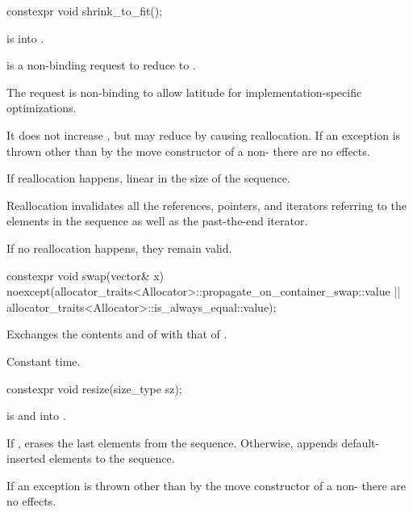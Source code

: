 %
\begin{itemdecl}
constexpr void shrink_to_fit();
\end{itemdecl}

\begin{itemdescr}
\pnum
\expects
{} is  into .

\pnum
\effects
{} is a non-binding request to reduce
 to .
\begin{note}
The request is non-binding to allow latitude for
implementation-specific optimizations.
\end{note}
It does not increase , but may reduce 
by causing reallocation.
If an exception is thrown other than by the move constructor
of a non-  there are no effects.

\pnum
\complexity
If reallocation happens,
linear in the size of the sequence.

\pnum
\remarks
Reallocation invalidates all the references, pointers, and iterators
referring to the elements in the sequence as well as the past-the-end iterator.
\begin{note}
If no reallocation happens, they remain valid.
\end{note}
\end{itemdescr}

%
\begin{itemdecl}
constexpr void swap(vector& x)
  noexcept(allocator_traits<Allocator>::propagate_on_container_swap::value ||
           allocator_traits<Allocator>::is_always_equal::value);
\end{itemdecl}

\begin{itemdescr}
\pnum
\effects
Exchanges the contents and
of
with that of .

\pnum
\complexity
Constant time.
\end{itemdescr}

%
\begin{itemdecl}
constexpr void resize(size_type sz);
\end{itemdecl}

\begin{itemdescr}
\pnum
\expects
{} is
 and  into .

\pnum
\effects
If , erases the last  elements
from the sequence. Otherwise,
appends  default-inserted elements to the sequence.

\pnum
\remarks
If an exception is thrown other than by the move constructor of a non-
 there are no effects.
\end{itemdescr}

